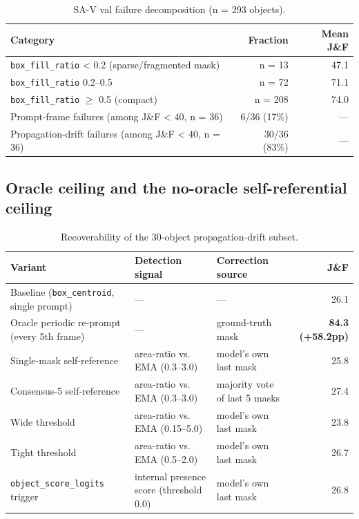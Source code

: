 \documentclass[11pt]{article}
\begin{document}
\begin{table}[!htbp]
\centering
\caption{SA-V val failure decomposition (n = 293 objects).}
\label{tab:2}
\small
\begin{tabularx}{\textwidth}{@{}Lrr@{}}
\toprule
Category & Fraction & Mean J\&F \\
\midrule
\texttt{box\_fill\_ratio} < 0.2 (sparse/fragmented mask) & n = 13 & 47.1 \\
\texttt{box\_fill\_ratio} 0.2–0.5 & n = 72 & 71.1 \\
\texttt{box\_fill\_ratio} $\geq$ 0.5 (compact) & n = 208 & 74.0 \\
Prompt-frame failures (among J\&F < 40, n = 36) & 6/36 (17\%) & --- \\
Propagation-drift failures (among J\&F < 40, n = 36) & 30/36 (83\%) & --- \\
\bottomrule
\end{tabularx}
\end{table}

\subsection{Oracle ceiling and the no-oracle self-referential ceiling}

\begin{table}[!htbp]
\centering
\caption{Recoverability of the 30-object propagation-drift subset.}
\label{tab:3}
\small
\begin{tabularx}{\textwidth}{@{}LLLr@{}}
\toprule
Variant & Detection signal & Correction source & J\&F \\
\midrule
Baseline (\texttt{box\_centroid}, single prompt) & --- & --- & 26.1 \\
Oracle periodic re-prompt (every 5th frame) & --- & ground-truth mask & \textbf{84.3 (+58.2pp)} \\
Single-mask self-reference & area-ratio vs. EMA (0.3–3.0) & model's own last mask & 25.8 \\
Consensus-5 self-reference & area-ratio vs. EMA (0.3–3.0) & majority vote of last 5 masks & 27.4 \\
Wide threshold & area-ratio vs. EMA (0.15–5.0) & model's own last mask & 23.8 \\
Tight threshold & area-ratio vs. EMA (0.5–2.0) & model's own last mask & 26.7 \\
\texttt{object\_score\_logits} trigger & internal presence score (threshold 0.0) & model's own last mask & 26.8 \\
\bottomrule
\end{tabularx}
\end{table}
\end{document}
